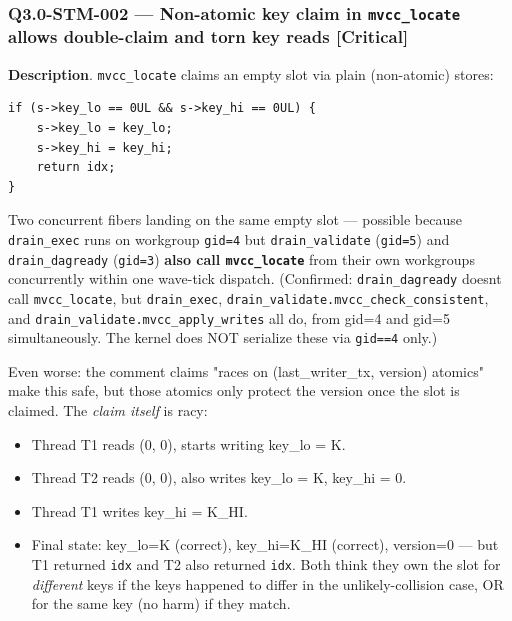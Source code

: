 \documentclass[
]{article}
\providecommand{\tightlist}{%
  \setlength{\itemsep}{0pt}\setlength{\parskip}{0pt}}
\begin{document}
\subsubsection{\texorpdfstring{Q3.0-STM-002 --- Non-atomic key claim in
\texttt{mvcc\_locate} allows double-claim and torn key reads
{[}Critical{]}}{Q3.0-STM-002 --- Non-atomic key claim in mvcc\_locate allows double-claim and torn key reads {[}Critical{]}}}\label{q30-stm-002--non-atomic-key-claim-in-mvcc_locate-allows-double-claim-and-torn-key-reads-critical}

\textbf{Description}. \texttt{mvcc\_locate} claims an empty slot via
plain (non-atomic) stores:

\begin{verbatim}
if (s->key_lo == 0UL && s->key_hi == 0UL) {
    s->key_lo = key_lo;
    s->key_hi = key_hi;
    return idx;
}
\end{verbatim}

Two concurrent fibers landing on the same empty slot --- possible
because \texttt{drain\_exec} runs on workgroup \texttt{gid=4} but
\texttt{drain\_validate} (\texttt{gid=5}) and \texttt{drain\_dagready}
(\texttt{gid=3}) \textbf{also call \texttt{mvcc\_locate}} from their own
workgroups concurrently within one wave-tick dispatch. (Confirmed:
\texttt{drain\_dagready} doesn\textquotesingle t call
\texttt{mvcc\_locate}, but \texttt{drain\_exec},
\texttt{drain\_validate.mvcc\_check\_consistent}, and
\texttt{drain\_validate.mvcc\_apply\_writes} all do, from gid=4 and
gid=5 simultaneously. The kernel does NOT serialize these via
\texttt{gid==4} only.)

Even worse: the comment claims "races on (last\_writer\_tx, version)
atomics" make this safe, but those atomics only protect the version once
the slot is claimed. The \emph{claim itself} is racy:

\begin{itemize}
\tightlist
\item
  Thread T1 reads (0, 0), starts writing key\_lo = K.
\item
  Thread T2 reads (0, 0), also writes key\_lo = K, key\_hi = 0.
\item
  Thread T1 writes key\_hi = K\_HI.
\item
  Final state: key\_lo=K (correct), key\_hi=K\_HI (correct), version=0
  --- but T1 returned \texttt{idx} and T2 also returned \texttt{idx}.
  Both think they own the slot for \emph{different} keys if the keys
  happened to differ in the unlikely-collision case, OR for the same key
  (no harm) if they match.
\end{itemize}
\end{document}
